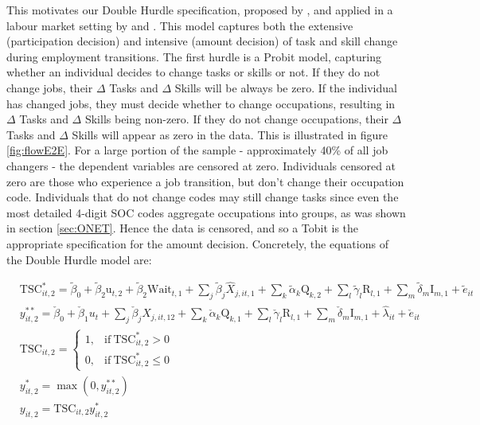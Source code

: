 \documentclass[12pt,authoryear]{elsarticle}
\begin{document}
	This motivates our Double Hurdle specification, proposed by \cite{cragg1971}, and applied in a labour market setting by \cite{BlundellMeghir} and \cite{Blundell1989}. This model captures both the extensive (participation decision) and intensive (amount decision) of task and skill change during employment transitions. The first hurdle is a Probit model, capturing whether an individual decides to change tasks or skills or not. If they do not change jobs, their $\Delta$ Tasks and $\Delta$ Skills will be always be zero. If the individual has changed jobs, they must decide whether to change occupations, resulting in $\Delta$ Tasks and $\Delta$ Skills being non-zero. If they do not change occupations, their $\Delta$ Tasks and $\Delta$ Skills will appear as zero in the data. This is illustrated in figure \ref{fig:flowE2E}.  For a large portion of the sample - approximately 40\% of all job changers - the dependent variables are censored at zero. Individuals censored at zero are those who experience a job transition, but don't change their occupation code. Individuals that do not change codes may still change tasks since even the most detailed 4-digit SOC codes aggregate occupations into groups, as was shown in section \ref{sec:ONET}. Hence the data is censored, and so a Tobit is the appropriate specification for the amount decision.  Concretely, the equations of the Double Hurdle model are:
	
	
	\begin{subequations}
		\label{eqn:heckman}
		\begin{align}
		& \text{TSC}^{*}_{it,2} = \tilde{\beta}_0 + \tilde{\beta}_{2}\text{u}_{t,2}  +  \tilde{\beta}_{2}\text{Wait}_{t,1} + \sum_{j} \tilde{\beta}_{j}\hat{X}_{j,it,1} + \sum_{k} \tilde{\alpha}_{k} \text{Q}_{k,2} + \sum_{l} \tilde{\gamma}_{l} \text{R}_{l,1} + \sum_{m} \tilde{\delta}_{m} \text{I}_{m,1}+  \tilde{e}_{it} \label{eqn:heckmanProbit}\\
		& y_{it,2}^{**} = \check{\beta}_0 + \check{\beta}_{1}u_{t} + \sum_{j} \check{\beta}_{j}X_{j,it,12} + \sum_{k}\check{\alpha}_{k} \text{Q}_{k,1} + \sum_{l} \check{\gamma}_{l} \text{R}_{l,1}  + \sum_{m} \check{\delta}_{m} \text{I}_{m,1} + \hat{\lambda}_{it} + \check{e}_{it} \label{eqn:heckmanTobit_start} \\
		&  \text{TSC}_{it,2} =
		\begin{cases}
			1, & \text{if}\ \text{TSC}^{*}_{it,2} >0  \\
			0, & \text{if}\ \text{TSC}^{*}_{it,2} \leq0  
		\end{cases}\label{eqn:tasksIndicator}\\
		& y_{it,2}^* =\max(0, y_{it,2}^{**})  \label{eqn:heckmanTobit_end} \\
		& y_{it,2} = \text{TSC}_{it,2}y_{it,2}^* \label{eqn:dh} 
		\end{align}
	\end{subequations}
	
\end{document}
